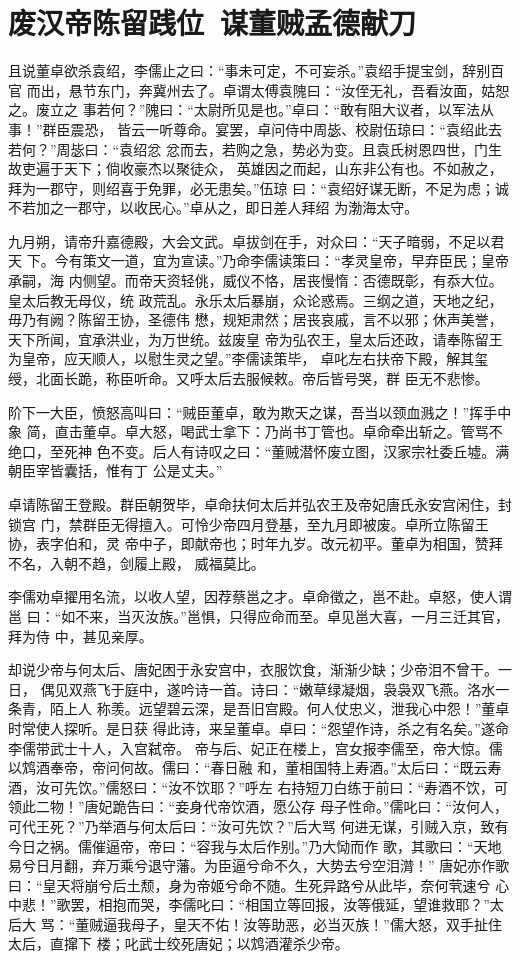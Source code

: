 \chapter{废汉帝陈留践位~谋董贼孟德献刀}

且说董卓欲杀袁绍，李儒止之曰：“事未可定，不可妄杀。”袁绍手提宝剑，辞别百官
而出，悬节东门，奔冀州去了。卓谓太傅袁隗曰：“汝侄无礼，吾看汝面，姑恕之。废立之
事若何？”隗曰：“太尉所见是也。”卓曰：“敢有阻大议者，以军法从事！”群臣震恐，
皆云一听尊命。宴罢，卓问侍中周毖、校尉伍琼曰：“袁绍此去若何？”周毖曰：“袁绍忿
忿而去，若购之急，势必为变。且袁氏树恩四世，门生故吏遍于天下；倘收豪杰以聚徒众，
英雄因之而起，山东非公有也。不如赦之，拜为一郡守，则绍喜于免罪，必无患矣。”伍琼
曰：“袁绍好谋无断，不足为虑；诚不若加之一郡守，以收民心。”卓从之，即日差人拜绍
为渤海太守。

九月朔，请帝升嘉德殿，大会文武。卓拔剑在手，对众曰：“天子暗弱，不足以君天
下。今有策文一道，宜为宣读。”乃命李儒读策曰：“孝灵皇帝，早弃臣民；皇帝承嗣，海
内侧望。而帝天资轻佻，威仪不恪，居丧慢惰：否德既彰，有忝大位。皇太后教无母仪，统
政荒乱。永乐太后暴崩，众论惑焉。三纲之道，天地之纪，毋乃有阙？陈留王协，圣德伟
懋，规矩肃然；居丧哀戚，言不以邪；休声美誉，天下所闻，宜承洪业，为万世统。兹废皇
帝为弘农王，皇太后还政，请奉陈留王为皇帝，应天顺人，以慰生灵之望。”李儒读策毕，
卓叱左右扶帝下殿，解其玺绶，北面长跪，称臣听命。又呼太后去服候敕。帝后皆号哭，群
臣无不悲惨。

阶下一大臣，愤怒高叫曰：“贼臣董卓，敢为欺天之谋，吾当以颈血溅之！”挥手中象
简，直击董卓。卓大怒，喝武士拿下：乃尚书丁管也。卓命牵出斩之。管骂不绝口，至死神
色不变。后人有诗叹之曰：“董贼潜怀废立图，汉家宗社委丘墟。满朝臣宰皆囊括，惟有丁
公是丈夫。”

卓请陈留王登殿。群臣朝贺毕，卓命扶何太后并弘农王及帝妃唐氏永安宫闲住，封锁宫
门，禁群臣无得擅入。可怜少帝四月登基，至九月即被废。卓所立陈留王协，表字伯和，灵
帝中子，即献帝也；时年九岁。改元初平。董卓为相国，赞拜不名，入朝不趋，剑履上殿，
威福莫比。

李儒劝卓擢用名流，以收人望，因荐蔡邕之才。卓命徵之，邕不赴。卓怒，使人谓邕
曰：“如不来，当灭汝族。”邕惧，只得应命而至。卓见邕大喜，一月三迁其官，拜为侍
中，甚见亲厚。

却说少帝与何太后、唐妃困于永安宫中，衣服饮食，渐渐少缺；少帝泪不曾干。一日，
偶见双燕飞于庭中，遂吟诗一首。诗曰：“嫩草绿凝烟，袅袅双飞燕。洛水一条青，陌上人
称羡。远望碧云深，是吾旧宫殿。何人仗忠义，泄我心中怨！”董卓时常使人探听。是日获
得此诗，来呈董卓。卓曰：“怨望作诗，杀之有名矣。”遂命李儒带武士十人，入宫弑帝。
帝与后、妃正在楼上，宫女报李儒至，帝大惊。儒以鸩酒奉帝，帝问何故。儒曰：“春日融
和，董相国特上寿酒。”太后曰：“既云寿酒，汝可先饮。”儒怒曰：“汝不饮耶？”呼左
右持短刀白练于前曰：“寿酒不饮，可领此二物！”唐妃跪告曰：“妾身代帝饮酒，愿公存
母子性命。”儒叱曰：“汝何人，可代王死？”乃举酒与何太后曰：“汝可先饮？”后大骂
何进无谋，引贼入京，致有今日之祸。儒催逼帝，帝曰：“容我与太后作别。”乃大恸而作
歌，其歌曰：“天地易兮日月翻，弃万乘兮退守藩。为臣逼兮命不久，大势去兮空泪潸！”
唐妃亦作歌曰：“皇天将崩兮后土颓，身为帝姬兮命不随。生死异路兮从此毕，奈何茕速兮
心中悲！”歌罢，相抱而哭，李儒叱曰：“相国立等回报，汝等俄延，望谁救耶？”太后大
骂：“董贼逼我母子，皇天不佑！汝等助恶，必当灭族！”儒大怒，双手扯住太后，直撺下
楼；叱武士绞死唐妃；以鸩酒灌杀少帝。

